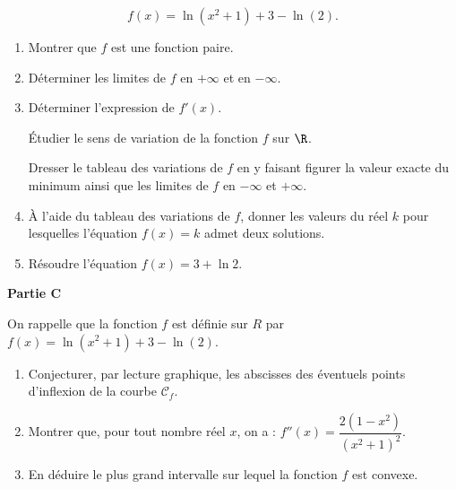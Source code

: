 \[f(x) = \ln \left(x^2 + 1\right) + 3 - \ln (2).\]

\medskip

\begin{enumerate}
\item Montrer que $f$ est une fonction paire.
\item Déterminer les limites de $f$ en $+\infty$ et en $-\infty$.
\item Déterminer l'expression de $f'(x)$.

Étudier le sens de variation de la fonction $f$ sur $\R$.

Dresser le tableau des variations de $f$ en y faisant figurer la valeur exacte du minimum ainsi que les limites de $f$ en $-\infty$ et $+\infty$.
\item À l'aide du tableau des variations de $f$, donner les valeurs du réel $k$ pour lesquelles l'équation $f(x) = k$ admet deux solutions.
\item Résoudre l'équation $f(x) = 3 + \ln 2$.
\end{enumerate}

\bigskip

\textbf{Partie C}

\medskip

On rappelle que la fonction $f$ est définie sur $R$ par $f(x) = \ln \left(x^2 + 1\right) + 3 - \ln (2)$.

\medskip

\begin{enumerate}
\item Conjecturer, par lecture graphique, les abscisses des éventuels points d'inflexion
de la courbe $\mathcal{C}_f$.
\item Montrer que, pour tout nombre réel $x$, on a : $f''(x) = \dfrac{2\left(1 - x^2\right)}{\left(x^2 + 1\right)^2}$.
\item En déduire le plus grand intervalle sur lequel la fonction $f$ est convexe.
\end{enumerate}

